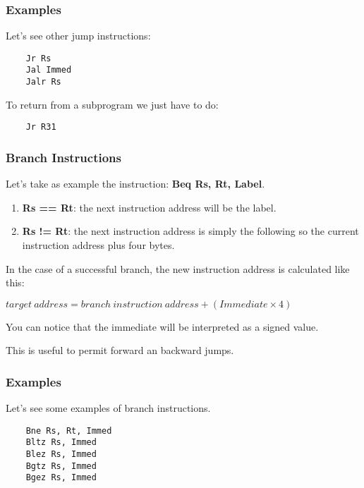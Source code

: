 
\begin{frame}[containsverbatim]
  \frametitle{Examples}

  Let's see other jump instructions:

  \begin{verbatim}
    Jr Rs
    Jal Immed
    Jalr Rs
  \end{verbatim}

  To return from a subprogram we just have to do:

  \begin{verbatim}
    Jr R31
  \end{verbatim}
\end{frame}


\begin{frame}
  \frametitle{Branch Instructions}

  Let's take as example the instruction: \textbf{Beq Rs, Rt, Label}.

  \begin{enumerate}
    \item
      \textbf{Rs == Rt}: the next instruction address will be the label.
    \item
      \textbf{Rs != Rt}: the next instruction address is simply the following
      so the current instruction address plus four bytes.
  \end{enumerate}

  \-

  In the case of a successful branch, the new instruction address is
  calculated like this:

  \-

  \begin{center}
    $target~address = branch~instruction~address + (Immediate \times 4)$
  \end{center}

  \-

  You can notice that the immediate will be interpreted as a signed value.

  \-

  This is useful to permit forward an backward jumps.
\end{frame}


\begin{frame}[containsverbatim]
  \frametitle{Examples}

  Let's see some examples of branch instructions.

  \begin{verbatim}
    Bne Rs, Rt, Immed
    Bltz Rs, Immed
    Blez Rs, Immed
    Bgtz Rs, Immed
    Bgez Rs, Immed
  \end{verbatim}
\end{frame}

